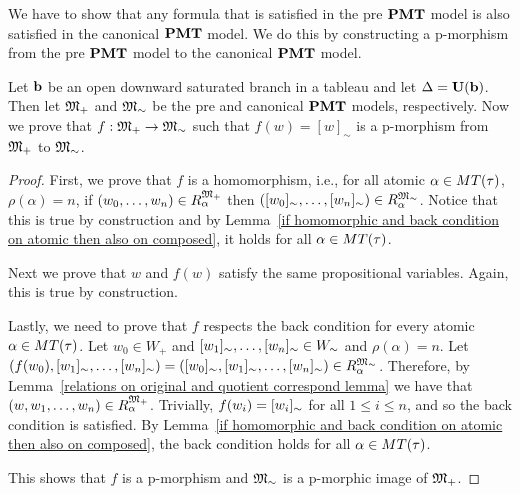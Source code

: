 \par We have to show that any formula that is satisfied in the pre $\textbf{PMT}$ model is also satisfied in the canonical $\textbf{PMT}$ model. We do this by constructing a p-morphism from the pre $\textbf{PMT}$ model to the canonical $\textbf{PMT}$ model.

\begin{theorem}\label{canonical model is p-morphic to pre model}
    Let $\textbf{b}$ be an open downward saturated branch in a tableau and let $\Delta=\textbf{U}(\textbf{b})$. Then let ${\mathfrak{M}_+}$ and ${\mathfrak{M}_\sim}$ be the pre and canonical $\textbf{PMT}$ models, respectively. Now we prove that $f:{\mathfrak{M}_+}\to{\mathfrak{M}_\sim}$ such that $f(w)=[w]_\sim$ is a p-morphism from ${\mathfrak{M}_+}$ to ${\mathfrak{M}_\sim}$.
\end{theorem}
\begin{proof}
    

    \par First, we prove that $f$ is a homomorphism, i.e., for all atomic $\alpha\in MT(\tau)$, $\rho(\alpha) = n$, if $(w_0,\ldots, w_n)\in R^{\mathfrak{M}_+}_\alpha$ then $([w_0]_\sim,\ldots,[w_n]_\sim)\in R^{\mathfrak{M}_\sim}_\alpha$. Notice that this is true by construction and by Lemma~\ref{if homomorphic and back condition on atomic then also on composed}, it holds for all $\alpha\in MT(\tau)$.
    \par Next we prove that $w$ and $f(w)$ satisfy the same propositional variables. Again, this is true by construction. 
    \par Lastly, we need to prove that $f$ respects the back condition for every atomic $\alpha\in MT(\tau)$. Let $w_0\in W_+$ and $[w_1]_\sim,\ldots, [w_n]_\sim\in W_\sim$ and $\rho(\alpha)=n$. Let $(f(w_0),[w_1]_\sim,\ldots,[w_n]_\sim) = ([w_0]_\sim,[w_1]_\sim,\ldots,[w_n]_\sim)\in R^{\mathfrak{M}_\sim}_\alpha$.
    Therefore, by Lemma~\ref{relations on original and quotient correspond lemma} we have that $(w,w_1,\ldots,w_n)\in R^{\mathfrak{M}_+}_\alpha$. Trivially, $f(w_i) = [w_i]_\sim$ for all $1\leq i\leq n$, and so the back condition is satisfied. By Lemma~\ref{if homomorphic and back condition on atomic then also on composed}, the back condition holds for all $\alpha\in MT(\tau)$.

\par This shows that $f$ is a p-morphism and ${\mathfrak{M}_\sim}$ is a p-morphic image of ${\mathfrak{M}_+}$.
\end{proof}

